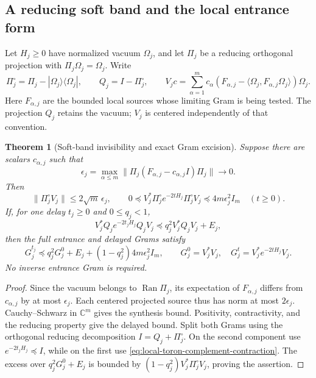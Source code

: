 \documentclass[11pt,oneside,openany]{book}
\newtheorem{theorem}{Theorem}[chapter]
\theoremstyle{definition}
\theoremstyle{remark}
\begin{document}
\subsection{A reducing soft band and the local entrance form}
Let $H_j\ge0$ have normalized vacuum $\Omega_j$, and let $\Pi_j$
be a reducing orthogonal projection with $\Pi_j\Omega_j=\Omega_j$.
Write
\[
 \Pi_j^\circ=\Pi_j-|\Omega_j\rangle\langle\Omega_j|,
 \qquad Q_j=I-\Pi_j^\circ,
 \qquad
 V_jc=\sum_{\alpha=1}^m c_\alpha
  (F_{\alpha,j}-\langle\Omega_j,F_{\alpha,j}\Omega_j\rangle)
                                                        \Omega_j.
\]
Here $F_{\alpha,j}$ are the bounded local sources whose limiting
Gram is being tested. The projection $Q_j$ retains the vacuum;
$V_j$ is centered independently of that convention.

\begin{theorem}[Soft-band invisibility and exact Gram excision]
\label{thm:local-toron-Gram-excision}
Suppose there are scalars $c_{\alpha,j}$ such that
\begin{equation}
 \epsilon_j=\max_{\alpha\le m}
  \|\Pi_j(F_{\alpha,j}-c_{\alpha,j}I)\Pi_j\|\longrightarrow0.
 \label{eq:local-toron-scalar-hypothesis}
\end{equation}
Then
\begin{equation}
 \|\Pi_j^\circ V_j\|\le2\sqrt m\,\epsilon_j,
 \qquad
 0\preceq V_j^*\Pi_j^\circ e^{-2tH_j}\Pi_j^\circ V_j
                 \preceq4m\epsilon_j^2I_m\quad(t\ge0).
 \label{eq:local-toron-Gram-invisibility}
\end{equation}
If, for one delay $t_j\ge0$ and $0\le q_j<1$,
\begin{equation}
 V_j^*Q_je^{-2t_jH_j}Q_jV_j
              \preceq q_j^2V_j^*Q_jV_j+E_j,
 \label{eq:local-toron-complement-contraction}
\end{equation}
then the full entrance and delayed Grams satisfy
\begin{equation}
 G_j^{t_j}\preceq q_j^2G_j^0+E_j
                         +(1-q_j^2)4m\epsilon_j^2I_m,
 \qquad
 G_j^0=V_j^*V_j,\quad G_j^t=V_j^*e^{-2tH_j}V_j.
 \label{eq:local-toron-full-contraction}
\end{equation}
No inverse entrance Gram is required.
\end{theorem}
\begin{proof}
Since the vacuum belongs to $\operatorname{Ran}\Pi_j$, its
expectation of $F_{\alpha,j}$ differs from $c_{\alpha,j}$ by at
most $\epsilon_j$. Each centered projected source thus has norm at
most $2\epsilon_j$. Cauchy--Schwarz in $\mathbb C^m$ gives the
synthesis bound. Positivity, contractivity, and the reducing property
give the delayed bound. Split both Grams using the orthogonal reducing
decomposition $I=Q_j+\Pi_j^\circ$. On the second component use
$e^{-2t_jH_j}\preceq I$, while on the first use
\cref{eq:local-toron-complement-contraction}. The excess over
$q_j^2G_j^0+E_j$ is bounded by
$(1-q_j^2)V_j^*\Pi_j^\circ V_j$, proving the assertion.
\end{proof}
\end{document}
